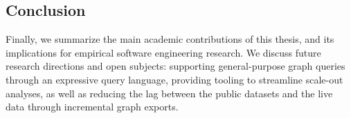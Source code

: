 \subsection*{Conclusion}

Finally, we summarize the main academic contributions of this thesis, and its
implications for empirical software engineering research. We discuss future
research directions and open subjects: supporting general-purpose graph queries
through an expressive query language, providing tooling to streamline scale-out
analyses, as well as reducing the lag between the public datasets and the live
data through incremental graph exports.
